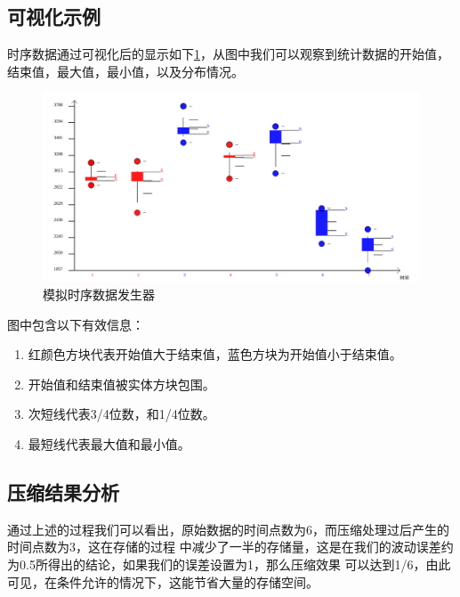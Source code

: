 \newpage 

\subsection{可视化示例}
\label{5.24}
时序数据通过可视化后的显示如下\ref{Figure 5-1-2}，从图中我们可以观察到统计数据的开始值，结束值，最大值，最小值，以及分布情况。

\begin{figure}[h!]
	\centering
	\includegraphics[scale=0.35]{./images/figure-5-2}
	\caption{模拟时序数据发生器}
	\label{Figure 5-1-2}
\end{figure}

图中包含以下有效信息：

\begin{enumerate}[(1)]
	\item 红颜色方块代表开始值大于结束值，蓝色方块为开始值小于结束值。
	\item 开始值和结束值被实体方块包围。
	\item 次短线代表3/4位数，和1/4位数。
	\item 最短线代表最大值和最小值。
\end{enumerate}





\subsection{压缩结果分析}
\label{5.25}
通过上述的过程我们可以看出，原始数据的时间点数为6，而压缩处理过后产生的时间点数为3，这在存储的过程
中减少了一半的存储量，这是在我们的波动误差约为0.5所得出的结论，如果我们的误差设置为1，那么压缩效果
可以达到1/6，由此可见，在条件允许的情况下，这能节省大量的存储空间。










